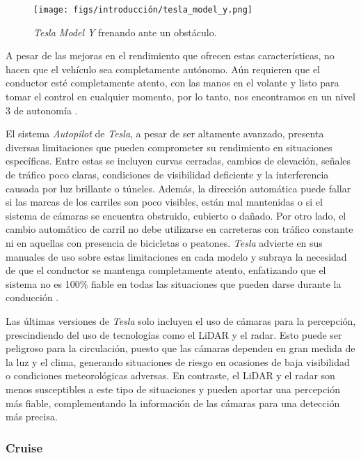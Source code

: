 \begin{figure}[ht]
\begin{center}
\texttt{[image: figs/introducción/tesla\_model\_y.png]}
\end{center}
\caption{\textit{Tesla Model Y} frenando ante un obstáculo.}
\label{fig:tesla}
\end{figure}

A pesar de las mejoras en el rendimiento que ofrecen estas características, no hacen que el vehículo sea completamente autónomo. Aún requieren que el conductor esté completamente atento, con las manos en el volante y listo para tomar el control en cualquier momento, por lo tanto, nos encontramos en un nivel 3 de autonomía \cite{tesla-autopilot}.

El sistema \textit{Autopilot} de \textit{Tesla}, a pesar de ser altamente avanzado, presenta diversas limitaciones que pueden comprometer su rendimiento en situaciones específicas. Entre estas se incluyen curvas cerradas, cambios de elevación, señales de tráfico poco claras, condiciones de visibilidad deficiente y la interferencia causada por luz brillante o túneles. Además, la dirección automática puede fallar si las marcas de los carriles son poco visibles, están mal mantenidas o si el sistema de cámaras se encuentra obstruido, cubierto o dañado. Por otro lado, el cambio automático de carril no debe utilizarse en carreteras con tráfico constante ni en aquellas con presencia de bicicletas o peatones. \textit{Tesla} advierte en sus manuales de uso sobre estas limitaciones en cada modelo y subraya la necesidad de que el conductor se mantenga completamente atento, enfatizando que el sistema no es 100\% fiable en todas las situaciones que pueden darse durante la conducción \cite{tesla-limitations}.

Las últimas versiones de \textit{Tesla} solo incluyen el uso de cámaras para la percepción, prescindiendo del uso de tecnologías como el \ac{LiDAR} y el radar. Esto puede ser peligroso para la circulación, puesto que las cámaras dependen en gran medida de la luz y el clima, generando situaciones de riesgo en ocasiones de baja visibilidad o condiciones meteorológicas adversas. En contraste, el \ac{LiDAR} y el radar son menos susceptibles a este tipo de situaciones y pueden aportar una percepción más fiable, complementando la información de las cámaras para una detección más precisa.

\subsubsection{Cruise}

